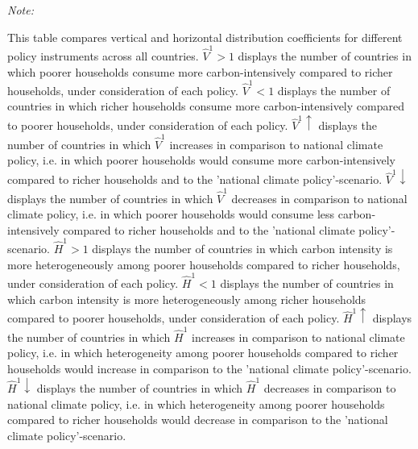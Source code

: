 \begingroup\fontsize{9}{11}\selectfont

\begin{ThreePartTable}
\begin{TableNotes}
\item \textit{Note: } 
\item This table compares vertical and horizontal distribution coefficients for different policy instruments across all countries. 
           $\hat{V}^{1} > 1$ displays the number of countries in which poorer households consume more carbon-intensively compared to richer households, under consideration of each policy.
           $\hat{V}^{1} < 1$ displays the number of countries in which richer households consume more carbon-intensively compared to poorer households, under consideration of each policy.
           $\hat{V}^{1} \uparrow$ displays the number of countries in which $\hat{V}^{1}$ increases in comparison to national climate policy, i.e. in which poorer households would consume more carbon-intensively compared to richer households and to the 'national climate policy'-scenario.
           $\hat{V}^{1} \downarrow$ displays the number of countries in which $\hat{V}^{1}$ decreases in comparison to national climate policy, i.e. in which poorer households would consume less carbon-intensively compared to richer households and to the 'national climate policy'-scenario.
           $\hat{H}^{1} > 1$ displays the number of countries in which carbon intensity is more heterogeneously among poorer households compared to richer households, under consideration of each policy.
           $\hat{H}^{1} < 1$ displays the number of countries in which carbon intensity is more heterogeneously among richer households compared to poorer households, under consideration of each policy.
           $\hat{H}^{1} \uparrow$ displays the number of countries in which $\hat{H}^{1}$ increases in comparison to national climate policy, i.e. in which heterogeneity among poorer households compared to richer households would increase in comparison to the 'national climate policy'-scenario.
           $\hat{H}^{1} \downarrow$ displays the number of countries in which $\hat{H}^{1}$ decreases in comparison to national climate policy, i.e. in which heterogeneity among poorer households compared to richer households would decrease in comparison to the 'national climate policy'-scenario.
\end{TableNotes}
\begin{longtable}[t]{l|cc|cc|cc|ccl|cc|cc|cc|ccl|cc|cc|cc|ccl|cc|cc|cc|ccl|cc|cc|cc|ccl|cc|cc|cc|ccl|cc|cc|cc|ccl|cc|cc|cc|ccl|cc|cc|cc|cc}

\end{longtable}
\end{ThreePartTable}
